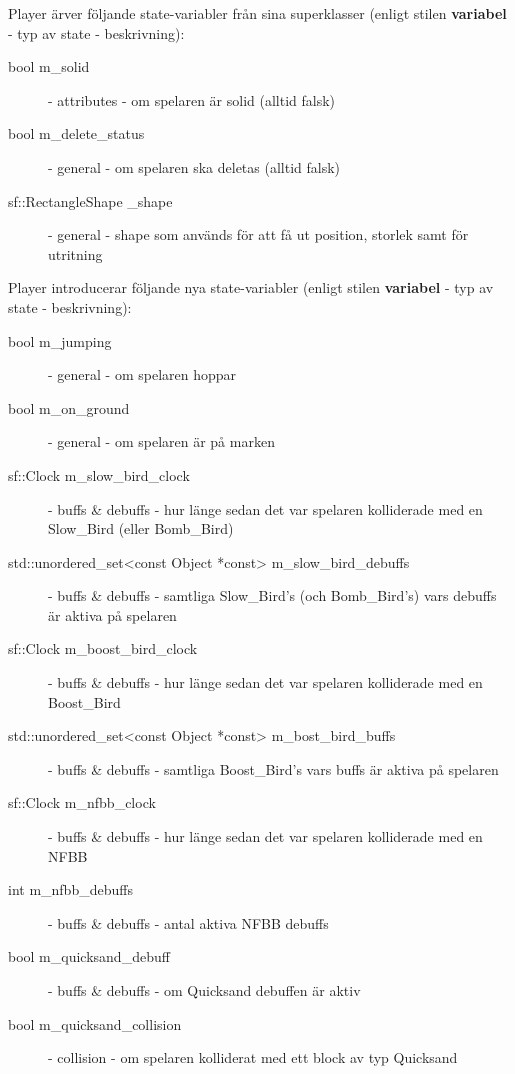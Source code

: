 \documentclass{TDP003mall}
\begin{document}
Player ärver följande state-variabler från sina superklasser (enligt stilen \textbf{variabel} - typ av state - beskrivning):
\begin{description}
\item[bool m\_solid] - attributes - om spelaren är solid (alltid falsk)
\item[bool m\_delete\_status] - general - om spelaren ska deletas (alltid falsk)
\item[sf::RectangleShape \_shape] - general - shape som används för att få ut position, storlek samt för utritning
\end{description}



Player introducerar följande nya state-variabler (enligt stilen \textbf{variabel} - typ av state - beskrivning):
\begin{description}
\item[bool m\_jumping] - general - om spelaren hoppar
\item[bool m\_on\_ground] - general - om spelaren är på marken
\item[sf::Clock m\_slow\_bird\_clock] - buffs \& debuffs - hur länge sedan det var spelaren kolliderade med en Slow\_Bird (eller Bomb\_Bird)

\item[std::unordered\_set<const Object *const> m\_slow\_bird\_debuffs] - buffs \& debuffs - samtliga Slow\_Bird's (och Bomb\_Bird's) vars debuffs är aktiva på spelaren

\item[sf::Clock m\_boost\_bird\_clock] - buffs \& debuffs - hur länge sedan det var spelaren kolliderade med en Boost\_Bird

\item[std::unordered\_set<const Object *const> m\_bost\_bird\_buffs] - buffs \& debuffs - samtliga Boost\_Bird's vars buffs är aktiva på spelaren

\item[sf::Clock m\_nfbb\_clock] - buffs \& debuffs - hur länge sedan det var spelaren kolliderade med en NFBB

\item[int m\_nfbb\_debuffs] - buffs \& debuffs - antal aktiva NFBB debuffs

\item[bool m\_quicksand\_debuff] - buffs \& debuffs - om Quicksand debuffen är aktiv

\item[bool m\_quicksand\_collision] - collision - om spelaren kolliderat med ett block av typ Quicksand
\end{description}
\end{document}
